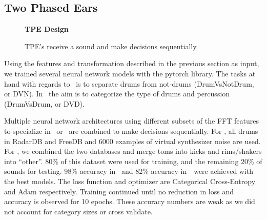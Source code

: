\documentclass[\main/thesis.tex]{subfiles}
\begin{document}
\subsection{Two Phased Ears}
\begin{figure}[t!]
    \begin{center}
    \textbf{TPE Design}
    \end{center}
    \caption{TPE's receive a sound and make decisions sequentially.}
\label{fig:TPE_design}
\end{figure}


\label{TPE_models}
Using the features and transformation described in the previous section as input, we trained several neural network models with the pytorch library. The tasks at hand with regards to \decfirst~is to separate drums from not-drums (DrumVsNotDrum, or DVN). In \decsecond~the aim is to categorize the type of drums and percussion (DrumVsDrum, or DVD). 

 Multiple neural network architectures using different subsets of the FFT features to specialize in \decfirst~or \decsecond~are combined to make decisions sequentially. For \decfirst, all drums in RadarDB and FreeDB and 6000 examples of virtual synthesizer noise are used. For \decsecond, we combined the two databases and merge toms into kicks and rims/shakers into \enquote{other}. 80\% of this dataset were used for training, and the remaining 20\% of sounds for testing. 98\% accuracy in \decfirst~and 82\% accuracy in~\decsecond~were achieved with the best models. The loss function and optimizer are Categorical Cross-Entropy and Adam respectively. Training continued until no reduction in loss and accuracy is observed for 10 epochs. These accuracy numbers are weak as we did not account for category sizes or cross validate.  
\end{document}
